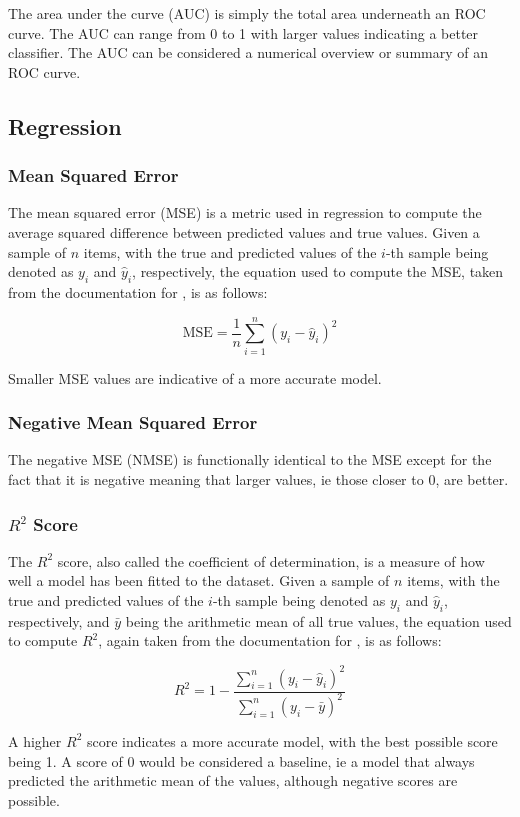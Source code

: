 The area under the curve (AUC) is simply the total area underneath an ROC curve. The AUC can range from 0 to 1 with larger values indicating a better classifier. The AUC can be considered a numerical overview or summary of an ROC curve.

\subsection{Regression} \label{sec:TBG_Eval_Regress}

\subsubsection{Mean Squared Error}

The mean squared error (MSE) is a metric used in regression to compute the average squared difference between predicted values and true values. Given a sample of $n$ items, with the true and predicted values of the $i$-th sample being denoted as $y_i$ and $\hat{y}_i$, respectively, the equation used to compute the MSE, taken from the documentation for \cite{pedregosa2011scikit}, is as follows:

\begin{equation*}
    \mathrm{MSE} = \frac{1}{n} \sum_{i=1}^n (y_i - \hat{y}_i)^2
\end{equation*}

Smaller MSE values are indicative of a more accurate model.

\subsubsection{Negative Mean Squared Error}

The negative MSE (NMSE) is functionally identical to the MSE except for the fact that it is negative meaning that larger values, ie those closer to 0, are better.

\subsubsection{$R^2$ Score}

The $R^2$ score, also called the coefficient of determination, is a measure of how well a model has been fitted to the dataset. Given a sample of $n$ items, with the true and predicted values of the $i$-th sample being denoted as $y_i$ and $\hat{y}_i$, respectively, and $\bar{y}$ being the arithmetic mean of all true values, the equation used to compute $R^2$, again taken from the documentation for \cite{pedregosa2011scikit}, is as follows:

\begin{equation*}
    R^2 = 1 - \frac{\sum_{i=1}^n (y_i - \hat{y}_i)^2}{\sum_{i=1}^n (y_i - \bar{y})^2}
\end{equation*}

A higher $R^2$ score indicates a more accurate model, with the best possible score being 1. A score of 0 would be considered a baseline, ie a model that always predicted the arithmetic mean of the values, although negative scores are possible.
